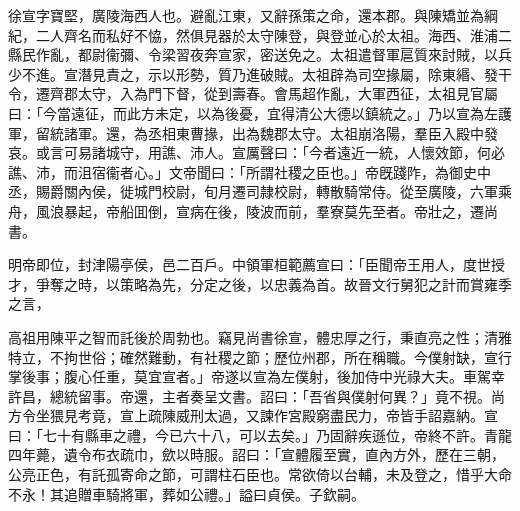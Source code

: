 \begin{pinyinscope}
 
 
 徐宣字寶堅，廣陵海西人也。避亂江東，又辭孫策之命，還本郡。與陳矯並為綱紀，二人齊名而私好不恊，然俱見器於太守陳登，與登並心於太祖。海西、淮浦二縣民作亂，都尉衞彌、令梁習夜奔宣家，密送免之。太祖遣督軍扈質來討賊，以兵少不進。宣潛見責之，示以形勢，質乃進破賊。太祖辟為司空掾屬，除東緡、發干令，遷齊郡太守，入為門下督，從到壽春。會馬超作亂，大軍西征，太祖見官屬曰：「今當遠征，而此方未定，以為後憂，宜得清公大德以鎮統之。」乃以宣為左護軍，留統諸軍。還，為丞相東曹掾，出為魏郡太守。太祖崩洛陽，羣臣入殿中發哀。或言可易諸城守，用譙、沛人。宣厲聲曰：「今者遠近一統，人懷效節，何必譙、沛，而沮宿衞者心。」文帝聞曰：「所謂社稷之臣也。」帝旣踐阼，為御史中丞，賜爵關內侯，徙城門校尉，旬月遷司隷校尉，轉散騎常侍。從至廣陵，六軍乘舟，風浪暴起，帝船囬倒，宣病在後，陵波而前，羣寮莫先至者。帝壯之，遷尚書。
 
 
 
 
 明帝即位，封津陽亭侯，邑二百戶。中領軍桓範薦宣曰：「臣聞帝王用人，度世授才，爭奪之時，以策略為先，分定之後，以忠義為首。故晉文行舅犯之計而賞雍季之言，
 
 
 高祖用陳平之智而託後於周勃也。竊見尚書徐宣，體忠厚之行，秉直亮之性；清雅特立，不拘世俗；確然難動，有社稷之節；歷位州郡，所在稱職。今僕射缺，宣行掌後事；腹心任重，莫宜宣者。」帝遂以宣為左僕射，後加侍中光祿大夫。車駕幸許昌，總統留事。帝還，主者奏呈文書。詔曰：「吾省與僕射何異？」竟不視。尚方令坐猥見考竟，宣上疏陳威刑太過，又諫作宮殿窮盡民力，帝皆手詔嘉納。宣曰：「七十有縣車之禮，今已六十八，可以去矣。」乃固辭疾遜位，帝終不許。青龍四年薨，遺令布衣疏巾，歛以時服。詔曰：「宣體履至實，直內方外，歷在三朝，公亮正色，有託孤寄命之節，可謂柱石臣也。常欲倚以台輔，未及登之，惜乎大命不永！其追贈車騎將軍，葬如公禮。」謚曰貞侯。子欽嗣。
 
 
\end{pinyinscope}